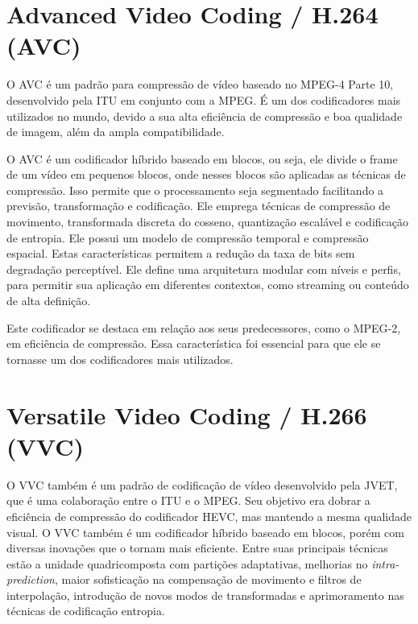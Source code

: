 \section{Advanced Video Coding / H.264 (AVC)}

O \acrshort{AVC} é um padrão para compressão de vídeo baseado no MPEG-4 Parte 10,
desenvolvido pela \acrfull{ITU} em conjunto com a \acrshort{MPEG}. É um dos
codificadores mais utilizados no mundo, devido a sua alta eficiência de compressão
e boa qualidade de imagem, além da ampla compatibilidade.

O \acrshort{AVC} é um codificador híbrido baseado em blocos, ou seja, ele divide
o frame de um vídeo em pequenos blocos, onde nesses blocos são aplicadas as técnicas de
compressão. Isso permite que o processamento seja segmentado facilitando a previsão,
transformação e codificação. Ele emprega técnicas de compressão de movimento, transformada discreta do 
cosseno, quantização escalável e codificação de entropia. Ele possui um modelo de 
compressão temporal e compressão espacial. Estas características permitem a redução 
da taxa de bits sem degradação perceptível. Ele define uma arquitetura modular com 
níveis e perfis, para permitir sua aplicação em diferentes contextos, como streaming 
ou conteúdo de alta definição.

Este codificador se destaca em relação aos seus predecessores, como o MPEG-2, em
eficiência de compressão. Essa característica foi essencial para que ele se tornasse
um dos codificadores mais utilizados. \cite{h264_white_paper}

\section{Versatile Video Coding / H.266 (VVC)}

O \acrshort{VVC} também é um padrão de codificação de vídeo desenvolvido pela \acrfull{JVET},
que é uma colaboração entre o \acrfull{ITU} e o \acrfull{MPEG}. Seu objetivo era
dobrar a eficiência de compressão do codificador \acrshort{HEVC}, mas mantendo a 
mesma qualidade visual. O \acrshort{VVC} também é um codificador híbrido baseado
em blocos, porém com diversas inovações que o tornam mais eficiente. Entre suas 
principais técnicas estão a unidade quadricomposta com partições adaptativas, melhorias
no \textit{intra-prediction}, maior sofisticação na compensação de movimento e filtros de
interpolação, introdução de novos modos de transformadas e aprimoramento nas técnicas de
codificação entropia. 

